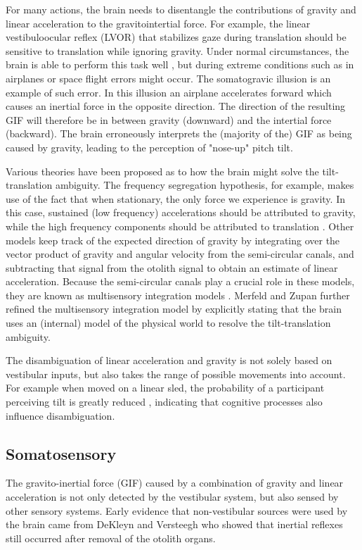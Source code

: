 For many actions, the brain needs to disentangle the contributions of gravity and linear acceleration to the gravitointertial force. For example, the linear vestibuloocular reflex (LVOR) that stabilizes gaze during translation should be sensitive to translation while ignoring gravity. Under normal circumstances, the brain is able to perform this task well \cite{merfeld1995}, but during extreme conditions such as in airplanes or space flight errors might occur. The somatogravic illusion \cite{glasauer1995} is an example of such error. In this illusion an airplane accelerates forward which causes an inertial force in the opposite direction. The direction of the resulting GIF will therefore be in between gravity (downward) and the intertial force (backward). The brain erroneously interprets the (majority of the) GIF as being caused by gravity, leading to the perception of "nose-up" pitch tilt.

Various theories have been proposed as to how the brain might solve the tilt-translation ambiguity. The frequency segregation hypothesis, for example, makes use of the fact that when stationary, the only force we experience is gravity. In this case, sustained (low frequency) accelerations should be  attributed to gravity, while the high frequency components should be attributed to translation \cite{paige1991, telford1997}. Other models keep track of the expected direction of gravity by integrating over the vector product of gravity and angular velocity from the semi-circular canals, and subtracting that signal from the otolith signal to obtain an estimate of linear acceleration. Because the semi-circular canals play a  crucial role in these models, they are known as multisensory integration models \cite{mayne1974,ormsby1977}. Merfeld and Zupan \citeyear{merfeld1995,merfeld2002} further refined the multisensory integration model by explicitly stating that the brain uses an (internal) model of the physical world to resolve the tilt-translation ambiguity.

The disambiguation of linear acceleration and gravity is not solely based on vestibular inputs, but also takes the  range of  possible movements into account. For example when moved on a linear sled, the probability of a participant perceiving tilt is greatly reduced \cite{wertheim2001}, indicating that cognitive processes also influence disambiguation.


\subsection{Somatosensory}
The gravito-inertial force (GIF) caused by a combination of gravity and linear acceleration is not only detected by the vestibular system, but also sensed by other sensory systems. Early evidence that non-vestibular sources were used by the brain came from DeKleyn and Versteegh \citeyear{dekleyn1933} who showed that inertial reflexes still occurred after removal of the otolith organs.

